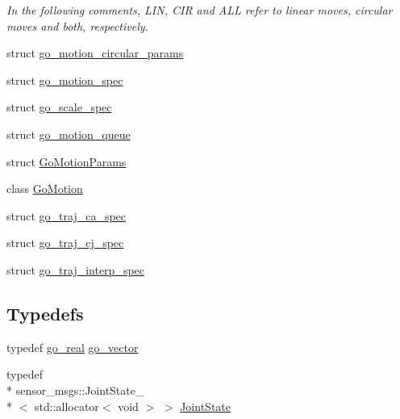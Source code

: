 \begin{DoxyCompactItemize}
\begin{DoxyCompactList}\small\item\em In the following comments, L\-I\-N, C\-I\-R and A\-L\-L refer to linear moves, circular moves and both, respectively. \end{DoxyCompactList}\item 
struct \hyperlink{structgomotion_1_1go__motion__circular__params}{go\-\_\-motion\-\_\-circular\-\_\-params}
\item 
struct \hyperlink{structgomotion_1_1go__motion__spec}{go\-\_\-motion\-\_\-spec}
\item 
struct \hyperlink{structgomotion_1_1go__scale__spec}{go\-\_\-scale\-\_\-spec}
\item 
struct \hyperlink{structgomotion_1_1go__motion__queue}{go\-\_\-motion\-\_\-queue}
\item 
struct \hyperlink{structgomotion_1_1_go_motion_params}{Go\-Motion\-Params}
\item 
class \hyperlink{classgomotion_1_1_go_motion}{Go\-Motion}
\item 
struct \hyperlink{structgomotion_1_1go__traj__ca__spec}{go\-\_\-traj\-\_\-ca\-\_\-spec}
\item 
struct \hyperlink{structgomotion_1_1go__traj__cj__spec}{go\-\_\-traj\-\_\-cj\-\_\-spec}
\item 
struct \hyperlink{structgomotion_1_1go__traj__interp__spec}{go\-\_\-traj\-\_\-interp\-\_\-spec}
\end{DoxyCompactItemize}
\subsection*{Typedefs}
\begin{DoxyCompactItemize}
\item 
typedef \hyperlink{gotypes_8h_afd666a2393eebd71ee455846ac9def9b}{go\-\_\-real} \hyperlink{namespacegomotion_a5739eac588a6a458ed9258bae0a3fc80}{go\-\_\-vector}
\item 
typedef \\*
sensor\-\_\-msgs\-::\-Joint\-State\-\_\-\\*
$<$ std\-::allocator$<$ void $>$ $>$ \hyperlink{namespacegomotion_a7b9d543e8aa36dfc345c5c38df12d427}{Joint\-State}
\end{DoxyCompactItemize}
